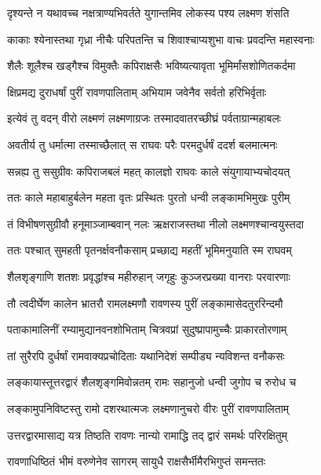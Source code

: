 \twolineshloka
{दृश्यन्ते न यथावच्च नक्षत्राण्यभिवर्तते}
{युगान्तमिव लोकस्य पश्य लक्ष्मण शंसति} %

\twolineshloka
{काकाः श्येनास्तथा गृध्रा नीचैः परिपतन्ति च}
{शिवाश्चाप्यशुभा वाचः प्रवदन्ति महास्वनाः} %

\twolineshloka
{शैलैः शूलैश्च खड्गैश्च विमुक्तैः कपिराक्षसैः}
{भविष्यत्यावृता भूमिर्मांसशोणितकर्दमा} %

\twolineshloka
{क्षिप्रमद्य दुराधर्षां पुरीं रावणपालिताम्}
{अभियाम जवेनैव सर्वतो हरिभिर्वृताः} %

\twolineshloka
{इत्येवं तु वदन् वीरो लक्ष्मणं लक्ष्मणाग्रजः}
{तस्मादवातरच्छीघ्रं पर्वताग्रान्महाबलः} %

\twolineshloka
{अवतीर्य तु धर्मात्मा तस्माच्छैलात् स राघवः}
{परैः परमदुर्धर्षं ददर्श बलमात्मनः} %

\twolineshloka
{सन्नह्य तु ससुग्रीवः कपिराजबलं महत्}
{कालज्ञो राघवः काले संयुगायाभ्यचोदयत्} %

\twolineshloka
{ततः काले महाबाहुर्बलेन महता वृतः}
{प्रस्थितः पुरतो धन्वी लङ्कामभिमुखः पुरीम्} %

\twolineshloka
{तं विभीषणसुग्रीवौ हनूमाञ्जाम्बवान् नलः}
{ऋक्षराजस्तथा नीलो लक्ष्मणश्चान्वयुस्तदा} %

\twolineshloka
{ततः पश्चात् सुमहती पृतनर्क्षवनौकसाम्}
{प्रच्छाद्य महतीं भूमिमनुयाति स्म राघवम्} %

\twolineshloka
{शैलशृङ्गाणि शतशः प्रवृद्धांश्च महीरुहान्}
{जगृहुः कुञ्जरप्रख्या वानराः परवारणाः} %

\twolineshloka
{तौ त्वदीर्घेण कालेन भ्रातरौ रामलक्ष्मणौ}
{रावणस्य पुरीं लङ्कामासेदतुररिन्दमौ} %

\twolineshloka
{पताकामालिनीं रम्यामुद्यानवनशोभिताम्}
{चित्रवप्रां सुदुष्प्रापामुच्चैः प्राकारतोरणाम्} %

\twolineshloka
{तां सुरैरपि दुर्धर्षां रामवाक्यप्रचोदिताः}
{यथानिदेशं सम्पीड्य न्यविशन्त वनौकसः} %

\twolineshloka
{लङ्कायास्तूत्तरद्वारं शैलशृङ्गमिवोन्नतम्}
{रामः सहानुजो धन्वी जुगोप च रुरोध च} %

\twolineshloka
{लङ्कामुपनिविष्टस्तु रामो दशरथात्मजः}
{लक्ष्मणानुचरो वीरः पुरीं रावणपालिताम्} %

\twolineshloka
{उत्तरद्वारमासाद्य यत्र तिष्ठति रावणः}
{नान्यो रामाद्धि तद् द्वारं समर्थः परिरक्षितुम्} %

\twolineshloka
{रावणाधिष्ठितं भीमं वरुणेनेव सागरम्}
{सायुधै राक्षसैर्भीमैरभिगुप्तं समन्ततः} %

